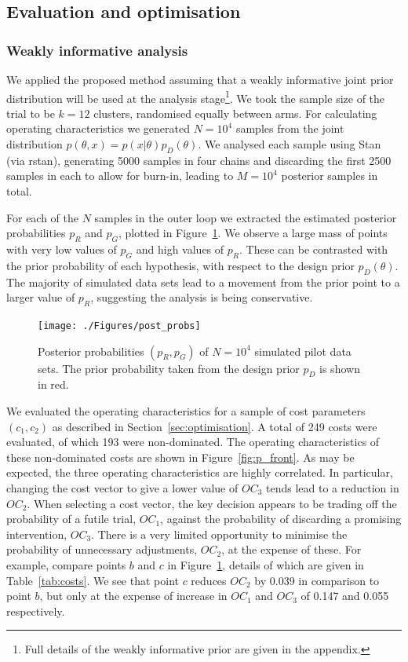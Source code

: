 \documentclass{article} %
\begin{document}
\subsection{Evaluation and optimisation}

\subsubsection{Weakly informative analysis}

We applied the proposed method assuming that a weakly informative joint prior distribution will be used at the analysis stage\footnote{Full details  of the weakly informative prior are given in the appendix.}. We took the sample size of the trial to be $k = 12$ clusters, randomised equally between arms. For calculating operating characteristics we generated $N = 10^4$ samples from the joint distribution $p(\theta, x) = p(x | \theta)p_D(\theta)$. We analysed each sample using Stan (via rstan), generating 5000 samples in four chains and discarding the first 2500 samples in each to allow for burn-in, leading to $M = 10^4$ posterior samples in total.

For each of the $N$ samples in the outer loop we extracted the estimated posterior probabilities $p_R$ and $p_G$, plotted in Figure~\ref{fig:post_probs}. We observe a large mass of points with very low values of $p_G$ and high values of $p_R$. These can be contrasted with the prior probability of each hypothesis, with respect to the design prior $p_D(\theta)$. The majority of simulated data sets lead to a movement from the prior point to a larger value of $p_R$, suggesting the analysis is being conservative.

\begin{figure}
\centering
\texttt{[image: ./Figures/post\_probs]}
\caption{Posterior probabilities $(p_{R}, p_{G})$ of $N = 10^4$ simulated pilot data sets. The prior probability taken from the design prior $p_D$ is shown in red.}
\label{fig:post_probs}
\end{figure}

We evaluated the operating characteristics for a sample of cost parameters $(c_1, c_2)$ as described in Section~\ref{sec:optimisation}. A total of 249 costs were evaluated, of which 193 were non-dominated. The operating characteristics of these non-dominated costs are shown in Figure~\ref{fig:p_front}. As may be expected, the three operating characteristics are highly correlated. In particular, changing the cost vector to give a lower value of $OC_3$ tends lead to a reduction in $OC_2$. When selecting a cost vector, the key decision appears to be trading off the probability of a futile trial, $OC_{1}$, against the probability of discarding a promising intervention, $OC_{3}$. There is a very limited opportunity to minimise the probability of unnecessary adjustments, $OC_{2}$, at the expense of these. For example, compare points $b$ and $c$ in Figure~\ref{fig:post_probs}, details of which are given in Table~\ref{tab:costs}. We see that point $c$ reduces $OC_2$ by 0.039 in comparison to point $b$, but only at the expense of increase in $OC_1$ and $OC_3$ of 0.147 and 0.055 respectively.
\end{document}
